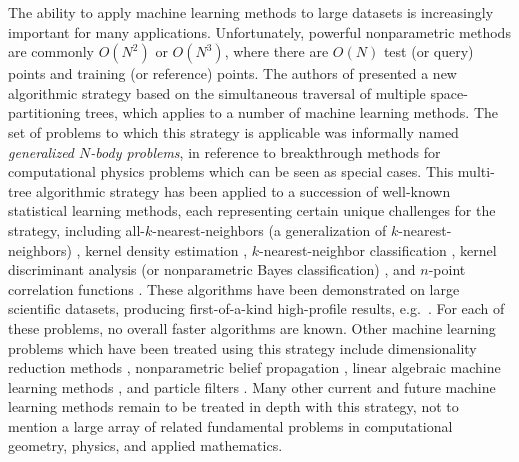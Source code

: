 \documentclass{article}
\begin{document}
The ability to apply machine learning methods to large datasets is
increasingly important for many applications.  Unfortunately,
powerful nonparametric methods are commonly $O(N^2)$ or
$O(N^3)$, where there are $O(N)$ test (or query) points and training
(or reference) points.
The authors of \cite{nips2000paper} presented a new algorithmic strategy
based on the simultaneous traversal of multiple space-partitioning
trees, which applies to a number of machine learning methods.  The set
of problems to which this strategy is applicable was informally named
{\em generalized $N$-body problems}, in reference to breakthrough
methods for computational physics problems \cite{appel2,barnes_hut,grngard}
which can be seen as special cases.
This multi-tree algorithmic strategy has been applied to a succession
of well-known statistical learning methods, each representing certain
unique challenges for the strategy, including
all-$k$-nearest-neighbors (a generalization of $k$-nearest-neighbors)
\cite{nips2000paper}, kernel density estimation \cite{nips2000paper,
kde-siamdm, kde-nips-dong, kde-uai-dong},
$k$-nearest-neighbor classification \cite{ting-liu}, kernel discriminant
analysis (or nonparametric Bayes classification) \cite{nbc-compstat}, and $n$-point correlation functions \cite{gray_nbody, moore01fast}.  These algorithms have been demonstrated on
large scientific datasets, producing first-of-a-kind high-profile
results, e.g.~\cite{science03, nature05}.  For each of these
problems, no overall faster algorithms are known.  Other machine
learning problems which have been treated using this strategy include
dimensionality reduction methods \cite{hochreiter00beyond}, nonparametric
belief propagation \cite{alex-ihler}, linear algebraic machine learning methods \cite{freitas_fast},
and particle filters \cite{klaas-toward}.
Many other current and future machine learning methods remain to be
treated in depth with this strategy, not to mention a large array of
related fundamental problems in computational geometry, physics, and
applied mathematics.  
\end{document}
